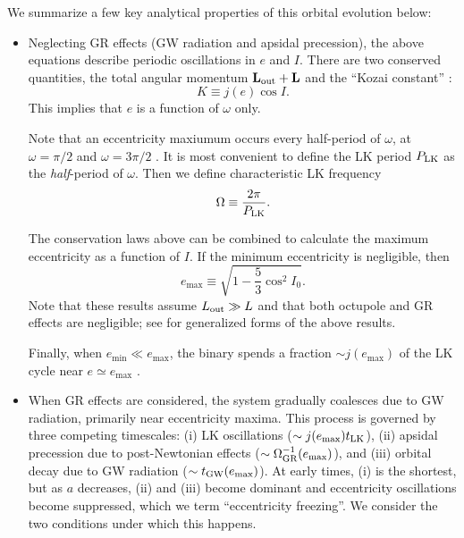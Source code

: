 \documentclass[
        twocolumn,
        twocolappendix
    ]{aastex63}
\renewcommand*{\bm}[1]{\boldsymbol{\mathbf{#1}}}
\begin{document}
We summarize a few key analytical properties of this orbital evolution below:
\begin{itemize}
    \item Neglecting GR effects (GW radiation and apsidal precession), the
        above equations describe periodic oscillations in $e$ and $I$. There are
        two conserved quantities, the total angular momentum $\bm{L}_{\rm out} +
        \bm{L}$ and the ``Kozai constant'' \citep{lidov,kozai}:
        \begin{equation}
            K \equiv j(e) \cos I.\label{eq:K_def}
        \end{equation}
        This implies that $e$ is a function of $\omega$ only.

        Note that an eccentricity maxiumum occurs every half-period of $\omega$,
        at $\omega = \pi/2$ and $\omega = 3\pi/2$ \citep{anderson2016formation}.
        It is most convenient to define the LK period $P_{\rm LK}$ as the
        \emph{half}-period of $\omega$. Then we define characteristic LK
        frequency
        \begin{equation}
            \Omega \equiv \frac{2\pi}{P_{\rm LK}}.\label{eq:WLK_def}
        \end{equation}

        The conservation laws above can be combined to calculate the maximum
        eccentricity as a function of $I$. If the minimum eccentricity is
        negligible, then
        \begin{equation}
            e_{\max} \equiv \sqrt{1 - \frac{5}{3}\cos^2 I_0}.\label{eq:emax}
        \end{equation}
        Note that these results assume $L_{\rm out} \gg L$ and that both
        octupole and GR effects are negligible; see \citet{bin2} for generalized
        forms of the above results.

        Finally, when $e_{\min} \ll e_{\max}$, the binary spends a fraction
        $\sim j(e_{\max})$ of the LK cycle near $e \simeq e_{\max}$
        \citep{anderson2016formation}.

    \item When GR effects are considered, the system gradually coalesces due
        to GW radiation, primarily near eccentricity maxima. This process is
        governed by three competing timescales: (i) LK oscillations ($\sim
        j(e_{\max}) t_{\rm LK}$), (ii) apsidal precession due to post-Newtonian
        effects ($\sim \Omega_{\rm GR}^{-1}(e_{\max})$), and (iii) orbital decay
        due to GW radiation ($\sim t_{\rm GW}(e_{\max})$). At early times, (i)
        is the shortest, but as $a$ decreases, (ii) and (iii) become dominant
        and eccentricity oscillations become suppressed, which we term
        ``eccentricity freezing''. We consider the two conditions under which
        this happens.


\end{itemize}
\end{document}

